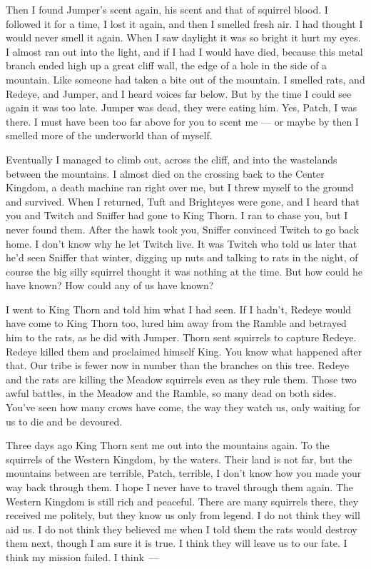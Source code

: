 \documentclass[ebook,oneside,openany,17pt]{memoir}
\begin{document}
Then I found Jumper’s scent again, his scent and that of squirrel
blood. I followed it for a time, I lost it again, and then I smelled
fresh air. I had thought I would never smell it again. When I saw
daylight it was so bright it hurt my eyes. I almost ran out into the
light, and if I had I would have died, because this metal branch ended
high up a great cliff wall, the edge of a hole in the side of a
mountain. Like someone had taken a bite out of the mountain. I smelled
rats, and Redeye, and Jumper, and I heard voices far below. But by the
time I could see again it was too late. Jumper was dead, they were
eating him. Yes, Patch, I was there. I must have been too far above
for you to scent me — or maybe by then I smelled more of the
underworld than of myself.

Eventually I managed to climb out, across the cliff, and into the
wastelands between the mountains. I almost died on the crossing back
to the Center Kingdom, a death machine ran right over me, but I threw
myself to the ground and survived. When I returned, Tuft and
Brighteyes were gone, and I heard that you and Twitch and Sniffer had
gone to King Thorn. I ran to chase you, but I never found them. After
the hawk took you, Sniffer convinced Twitch to go back home. I don’t
know why he let Twitch live. It was Twitch who told us later that he’d
seen Sniffer that winter, digging up nuts and talking to rats in the
night, of course the big silly squirrel thought it was nothing at the
time. But how could he have known? How could any of us have known?

I went to King Thorn and told him what I had seen. If I hadn’t, Redeye
would have come to King Thorn too, lured him away from the Ramble and
betrayed him to the rats, as he did with Jumper. Thorn sent squirrels
to capture Redeye. Redeye killed them and proclaimed himself King. You
know what happened after that. Our tribe is fewer now in number than
the branches on this tree. Redeye and the rats are killing the Meadow
squirrels even as they rule them. Those two awful battles, in the
Meadow and the Ramble, so many dead on both sides. You’ve seen how
many crows have come, the way they watch us, only waiting for us to
die and be devoured.

Three days ago King Thorn sent me out into the mountains again. To the
squirrels of the Western Kingdom, by the waters. Their land is not
far, but the mountains between are terrible, Patch, terrible, I don’t
know how you made your way back through them. I hope I never have to
travel through them again. The Western Kingdom is still rich and
peaceful. There are many squirrels there, they received me politely,
but they know us only from legend. I do not think they will aid us. I
do not think they believed me when I told them the rats would destroy
them next, though I am sure it is true. I think they will leave us to
our fate. I think my mission failed. I think\ —
\end{document}
